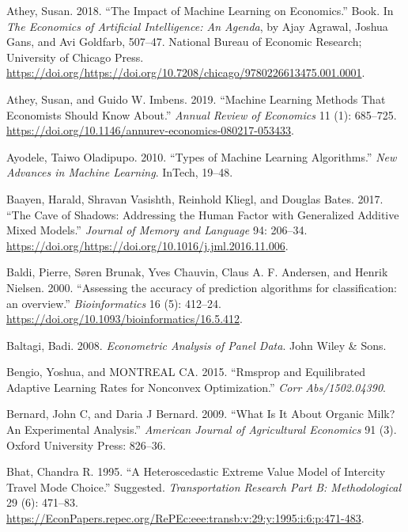 \documentclass[12pt,]{article}
\begin{document}
\leavevmode\hypertarget{ref-athey2018iml}{}%
Athey, Susan. 2018. ``The Impact of Machine Learning on Economics.''
Book. In \emph{The Economics of Artificial Intelligence: An Agenda}, by
Ajay Agrawal, Joshua Gans, and Avi Goldfarb, 507--47. National Bureau of
Economic Research; University of Chicago Press.
\url{https://doi.org/https://doi.org/10.7208/chicago/9780226613475.001.0001}.

\leavevmode\hypertarget{ref-athey2019ml}{}%
Athey, Susan, and Guido W. Imbens. 2019. ``Machine Learning Methods That
Economists Should Know About.'' \emph{Annual Review of Economics} 11
(1): 685--725.
\url{https://doi.org/10.1146/annurev-economics-080217-053433}.

\leavevmode\hypertarget{ref-ayodele2010tml}{}%
Ayodele, Taiwo Oladipupo. 2010. ``Types of Machine Learning
Algorithms.'' \emph{New Advances in Machine Learning}. InTech, 19--48.

\leavevmode\hypertarget{ref-baayen2017gam}{}%
Baayen, Harald, Shravan Vasishth, Reinhold Kliegl, and Douglas Bates.
2017. ``The Cave of Shadows: Addressing the Human Factor with
Generalized Additive Mixed Models.'' \emph{Journal of Memory and
Language} 94: 206--34.
\url{https://doi.org/https://doi.org/10.1016/j.jml.2016.11.006}.

\leavevmode\hypertarget{ref-baldi2000ar}{}%
Baldi, Pierre, Søren Brunak, Yves Chauvin, Claus A. F. Andersen, and
Henrik Nielsen. 2000. ``Assessing the accuracy of prediction algorithms
for classification: an overview.'' \emph{Bioinformatics} 16 (5):
412--24. \url{https://doi.org/10.1093/bioinformatics/16.5.412}.

\leavevmode\hypertarget{ref-baltagi2008econometric}{}%
Baltagi, Badi. 2008. \emph{Econometric Analysis of Panel Data}. John
Wiley \& Sons.

\leavevmode\hypertarget{ref-bengio2015rmsprop}{}%
Bengio, Yoshua, and MONTREAL CA. 2015. ``Rmsprop and Equilibrated
Adaptive Learning Rates for Nonconvex Optimization.'' \emph{Corr
Abs/1502.04390}.

\leavevmode\hypertarget{ref-bernard2009organic}{}%
Bernard, John C, and Daria J Bernard. 2009. ``What Is It About Organic
Milk? An Experimental Analysis.'' \emph{American Journal of Agricultural
Economics} 91 (3). Oxford University Press: 826--36.

\leavevmode\hypertarget{ref-bhat1995evm}{}%
Bhat, Chandra R. 1995. ``A Heteroscedastic Extreme Value Model of
Intercity Travel Mode Choice.'' Suggested. \emph{Transportation Research
Part B: Methodological} 29 (6): 471--83.
\url{https://EconPapers.repec.org/RePEc:eee:transb:v:29:y:1995:i:6:p:471-483}.
\end{document}
